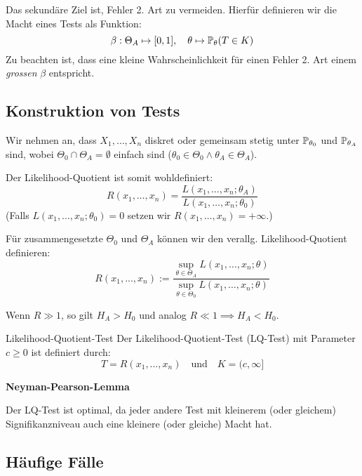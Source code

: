 Das sekundäre Ziel ist, Fehler 2. Art zu vermeiden. Hierfür definieren wir die Macht eines Tests als Funktion:
\[\beta : \Theta_A \mapsto [0,1], \quad \theta \mapsto \P_\theta(T \in K)\]
Zu beachten ist, dass eine kleine Wahrscheinlichkeit für einen Fehler 2. Art einem \textit{grossen} \(\beta\) entspricht.

\subsection{Konstruktion von Tests}
Wir nehmen an, dass \(X_1, \ldots, X_n\) diskret oder gemeinsam stetig unter \(\P_{\theta_0}\) und \(\P_{\theta_A}\) sind, wobei \(\Theta_0 \cap \Theta_A = \emptyset\) einfach sind (\(\theta_0 \in \Theta_0 \land \theta_A \in \Theta_A\)).

\noindent Der Likelihood-Quotient ist somit wohldefiniert:
\[R(x_1, \ldots, x_n) = \frac{L(x_1,\ldots, x_n;\theta_A)}{L(x_1, \ldots, x_n;\theta_0)}\]
(Falls \(L(x_1, \ldots, x_n; \theta_0) = 0\) setzen wir \(R(x_1, \ldots, x_n) = +\infty\).) 

Für zusammengesetzte $\Theta_0$ und $\Theta_A$ können wir den verallg. Likelihood-Quotient definieren:
\[R(x_1, ..., x_n) := \frac{\sup_{\theta \in \Theta_A}L(x_1, \dots, x_n; \theta)}{\sup_{\theta \in \Theta_0}L(x_1, \dots, x_n; \theta)}\]


Wenn \(R \gg 1\), so gilt \(H_A > H_0\) und analog \(R \ll 1 \implies H_A < H_0\).

\begin{subbox}{Likelihood-Quotient-Test}
	Der Likelihood-Quotient-Test (LQ-Test) mit Parameter \(c \ge 0\) ist definiert durch:
	\[T = R(x_1, \ldots, x_n) \quad \text{und} \quad K = (c, \infty]\]
\end{subbox}
\textbf{Neyman-Pearson-Lemma}

Der LQ-Test ist optimal, da jeder andere Test mit kleinerem (oder gleichem) Signifikanzniveau auch eine kleinere (oder gleiche) Macht hat.

\subsection{Häufige Fälle}
